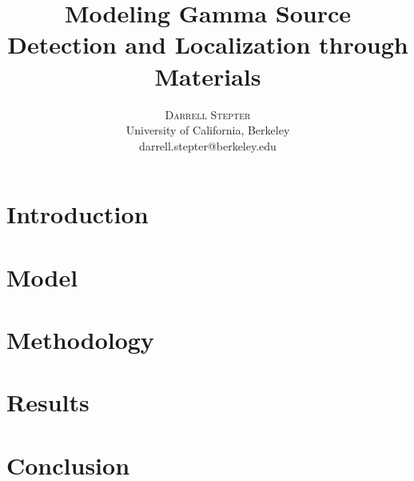 \documentclass[twoside,twocolumn]{article}
\title{\myfont Modeling Gamma Source Detection and Localization through Materials}
\author{
\textsc{Darrell Stepter} \\
\normalsize {University of California, Berkeley} \\
\normalsize {darrell.stepter@berkeley.edu} \\
}
\begin{document}
\maketitle


\section{Introduction}
\label{sec:intro}


\section{Model}
\label{sec:Model}


\section{Methodology}
\label{sec:Methodology}


\section{Results}
\label{sec:results}


\section{Conclusion}
\label{sec:conclusion}






\end{document}
